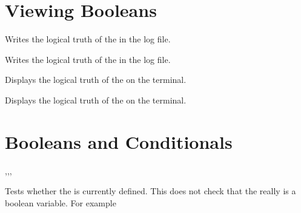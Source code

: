 \documentclass[oneside]{book}
\begin{document}
\section{Viewing Booleans}

\begin{function}{\BoolLog}
\begin{syntax}
 
\end{syntax}
Writes the logical truth of the  in the log file.
\end{function}

\begin{function}{\BoolVarLog}
\begin{syntax}
 
\end{syntax}
Writes the logical truth of the  in the log file.
\end{function}

\begin{function}{\BoolShow}
\begin{syntax}
 
\end{syntax}
Displays the logical truth of the  on the terminal.
\end{function}

\begin{function}{\BoolVarShow}
\begin{syntax}
 
\end{syntax}
Displays the logical truth of the  on the terminal.
\end{function}

\section{Booleans and Conditionals}

\begin{function}{\BoolIfExist,\BoolIfExistT,\BoolIfExistF,\BoolIfExistTF}
\begin{syntax}
 
  
  
   
\end{syntax}
Tests whether the  is currently defined.  This does not
check that the  really is a boolean variable.
For example
\begin{demohigh}
\BoolIfExistTF {} {}
\BoolIfExistTF {} {}
\end{demohigh}
\end{function}
\end{document}
